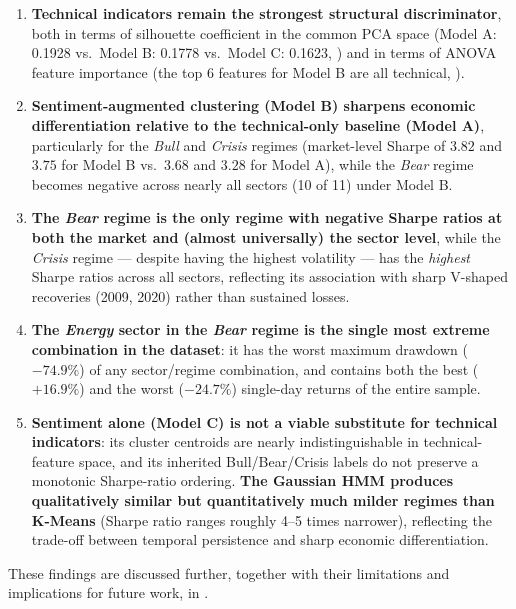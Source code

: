 \begin{enumerate}
  \item \textbf{Technical indicators remain the strongest structural
  discriminator}, both in terms of silhouette coefficient in the common
  PCA space (Model A: 0.1928 vs.\ Model B: 0.1778 vs.\ Model C: 0.1623,
  ) and in terms of ANOVA feature
  importance (the top 6 features for Model B are all technical,
  ).

  \item \textbf{Sentiment-augmented clustering (Model B) sharpens economic
  differentiation relative to the technical-only baseline (Model A)},
  particularly for the \emph{Bull} and \emph{Crisis} regimes (market-level
  Sharpe of $3.82$ and $3.75$ for Model B vs.\ $3.68$ and $3.28$ for Model
  A), while the \emph{Bear} regime becomes negative across nearly all
  sectors (10 of 11) under Model B.

  \item \textbf{The \emph{Bear} regime is the only regime with negative
  Sharpe ratios at both the market and (almost universally) the sector
  level}, while the \emph{Crisis} regime --- despite having the highest
  volatility --- has the \emph{highest} Sharpe ratios across all sectors,
  reflecting its association with sharp V-shaped recoveries (2009, 2020)
  rather than sustained losses.

  \item \textbf{The \emph{Energy} sector in the \emph{Bear} regime is the
  single most extreme combination in the dataset}: it has the worst
  maximum drawdown ($-74.9\%$) of any sector/regime combination, and
  contains both the best ($+16.9\%$) and the worst ($-24.7\%$) single-day
  returns of the entire sample.

  \item \textbf{Sentiment alone (Model C) is not a viable substitute for
  technical indicators}: its cluster centroids are nearly
  indistinguishable in technical-feature space, and its inherited
  Bull/Bear/Crisis labels do not preserve a monotonic Sharpe-ratio
  ordering. \textbf{The Gaussian HMM produces qualitatively similar but
  quantitatively much milder regimes than K-Means} (Sharpe ratio ranges
  roughly 4--5 times narrower), reflecting the trade-off between temporal
  persistence and sharp economic differentiation.
\end{enumerate}

These findings are discussed further, together with their limitations and
implications for future work, in .
